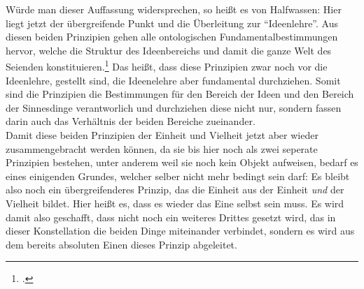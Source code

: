 Würde man dieser Auffassung widersprechen, so heißt es von Halfwassen:
Hier liegt jetzt der übergreifende Punkt und die Überleitung zur \enquote{Ideenlehre}. Aus diesen beiden Prinzipien gehen alle ontologischen Fundamentalbestimmungen hervor, welche die Struktur des Ideenbereichs und damit die ganze Welt des Seienden konstituieren.\footcite[vgl.][S. 104]{halfwassen2015spuren} Das heißt, dass diese Prinzipien zwar noch vor die Ideenlehre, gestellt sind, die Ideenelehre aber fundamental durchziehen. Somit sind die Prinzipien die Bestimmungen für den Bereich der Ideen und den Bereich der Sinnesdinge verantworlich und durchziehen diese nicht nur, sondern fassen darin auch das Verhältnis der beiden Bereiche zueinander.\\
Damit diese beiden Prinzipien der Einheit und Vielheit jetzt aber wieder zusammengebracht werden können, da sie bis hier noch als zwei seperate Prinzipien bestehen, unter anderem weil sie noch kein Objekt aufweisen, bedarf es eines einigenden Grundes, welcher selber nicht mehr bedingt sein darf:
Es bleibt also noch ein übergreifenderes Prinzip, das die Einheit aus der Einheit \emph{und} der Vielheit bildet. Hier heißt es, dass es wieder das Eine selbst sein muss. Es wird damit also geschafft, dass nicht noch ein weiteres Drittes gesetzt wird, das in dieser Konstellation die beiden Dinge miteinander verbindet, sondern es wird aus dem bereits absoluten Einen dieses Prinzip abgeleitet. 
